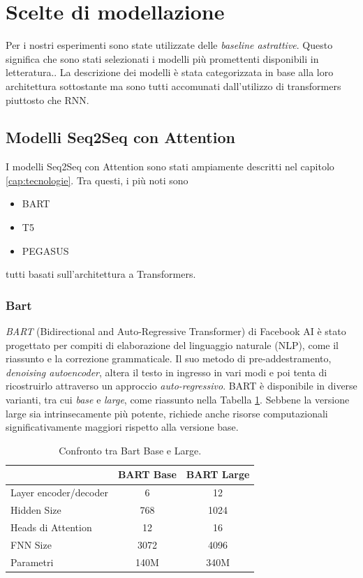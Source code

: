 \documentclass[12pt,a4paper,twoside,openright]{book}
\begin{document}
\section{Scelte di modellazione}
Per i nostri esperimenti sono state utilizzate delle \emph{baseline astrattive}. Questo significa che sono stati selezionati i modelli più promettenti disponibili in letteratura.. La descrizione dei modelli è stata categorizzata in base alla loro architettura sottostante ma sono tutti accomunati dall'utilizzo di transformers piuttosto che RNN.

\subsection{Modelli Seq2Seq con Attention}
I modelli Seq2Seq con Attention sono stati ampiamente descritti nel capitolo \ref{cap:tecnologie}. Tra questi, i più noti sono 
\begin{itemize}
    \item BART
    \item T5
    \item PEGASUS
\end{itemize}
tutti basati sull'architettura a Transformers.

\subsubsection{Bart}
\emph{BART} (Bidirectional and Auto-Regressive Transformer) \cite{DBLP:journals/corr/abs-1910-13461} di Facebook AI è stato progettato per compiti di elaborazione del linguaggio naturale (NLP), come il riassunto e la correzione grammaticale. Il suo metodo di pre-addestramento, \emph{denoising autoencoder}, altera il testo in ingresso in vari modi e poi tenta di ricostruirlo attraverso un approccio \emph{auto-regressivo}. BART è disponibile in diverse varianti, tra cui \emph{base} e \emph{large}, come riassunto nella Tabella \ref{tab:bart-comparison}. Sebbene la versione large sia intrinsecamente più potente, richiede anche risorse computazionali significativamente maggiori rispetto alla versione base. 

\begin{table}
    \centering
    \begin{tabular}{|l|c|c|}
    \hline
    & BART Base & BART Large \\ \hline
    Layer encoder/decoder & 6 & 12 \\ 
    Hidden Size & 768 & 1024 \\ 
    Heads di Attention & 12 & 16 \\
    FNN Size & 3072 & 4096 \\ 
    Parametri & 140M & 340M \\ \hline
    \end{tabular}
    \caption{Confronto tra Bart Base e Large.}
    \label{tab:bart-comparison}
\end{table}
\end{document}
